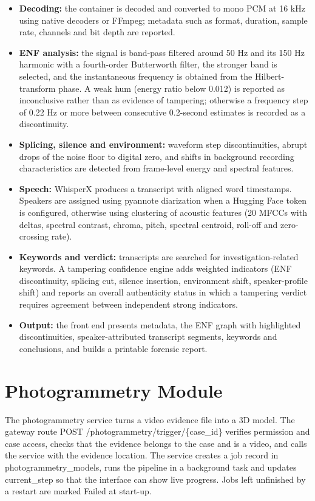 \documentclass[12pt,a4paper,oneside]{report}
\newcommand{\code}[1]{{\small\ttfamily #1}}
\begin{document}
\begin{itemize}
  \item \textbf{Decoding:} the container is decoded and converted to mono PCM at 16 kHz using native decoders or FFmpeg; metadata such as format, duration, sample rate, channels and bit depth are reported.
  \item \textbf{ENF analysis:} the signal is band-pass filtered around 50 Hz and its 150 Hz harmonic with a fourth-order Butterworth filter, the stronger band is selected, and the instantaneous frequency is obtained from the Hilbert-transform phase. A weak hum (energy ratio below 0.012) is reported as inconclusive rather than as evidence of tampering; otherwise a frequency step of 0.22 Hz or more between consecutive 0.2-second estimates is recorded as a discontinuity.
  \item \textbf{Splicing, silence and environment:} waveform step discontinuities, abrupt drops of the noise floor to digital zero, and shifts in background recording characteristics are detected from frame-level energy and spectral features.
  \item \textbf{Speech:} WhisperX produces a transcript with aligned word timestamps. Speakers are assigned using pyannote diarization when a Hugging Face token is configured, otherwise using clustering of acoustic features (20 MFCCs with deltas, spectral contrast, chroma, pitch, spectral centroid, roll-off and zero-crossing rate).
  \item \textbf{Keywords and verdict:} transcripts are searched for investigation-related keywords. A tampering confidence engine adds weighted indicators (ENF discontinuity, splicing cut, silence insertion, environment shift, speaker-profile shift) and reports an overall authenticity status in which a tampering verdict requires agreement between independent strong indicators.
  \item \textbf{Output:} the front end presents metadata, the ENF graph with highlighted discontinuities, speaker-attributed transcript segments, keywords and conclusions, and builds a printable forensic report.
\end{itemize}

\section{Photogrammetry Module}
The photogrammetry service turns a video evidence file into a 3D model. The gateway route \code{POST /\allowbreak{}photogrammetry/\allowbreak{}trigger/\allowbreak{}\{case\_\allowbreak{}id\}} verifies permission and case access, checks that the evidence belongs to the case and is a video, and calls the service with the evidence location. The service creates a job record in \code{photogrammetry\_\allowbreak{}models}, runs the pipeline in a background task and updates \code{current\_\allowbreak{}step} so that the interface can show live progress. Jobs left unfinished by a restart are marked Failed at start-up.
\end{document}
